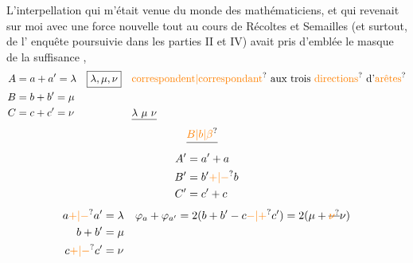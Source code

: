 L'interpellation qui m'était venue du monde des mathématiciens, et qui revenait sur moi avec une force nouvelle tout au cours  de Récoltes et Semailles (et surtout,  de l' enquête poursuivie dans les parties II et IV) avait pris d'emblée le masque de la suffisance ,
\[
\begin{aligned}
 A &=a+a'=\lambda &\boxed{\lambda,\mu,\nu}\quad&\text{\unsure{correspondent|correspondant} aux trois \unsure{directions} d'\unsure{arêtes}}\\
 B &=b+b'=\mu\\
 C &=c+c'=\nu & &\underline{\lambda\ \mu\ \nu}
\end{aligned}
\]
\[
\begin{aligned}
 &\deleted{\unsure{B|b|\beta}}\\
 A'&=a'+a\\
 B'&=b'\unsure{+|-}b\\
 C'&=c'+c
\end{aligned}
\]
\[
\begin{aligned}
 a\unsure{+|-}a'&=\lambda &
 \varphi_a+\varphi_{a'}&=2(b+b'-c\unsure{-|+}c')=2(\mu+\deleted{\unsure{\nu}}\nu)\\
 b+b'&=\mu\\
 c\unsure{+|-}c'&=\nu
\end{aligned}
\]
